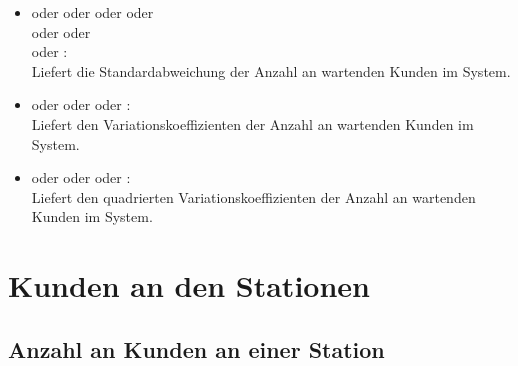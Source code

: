 \begin{itemize}
\item
{} oder  oder  oder  oder\\
 oder  oder\\
 oder :\\
Liefert die Standardabweichung der Anzahl an wartenden Kunden im System.

\item
{} oder  oder  oder :\\
Liefert den Variationskoeffizienten der Anzahl an wartenden Kunden im System.

\item
{} oder  oder  oder :\\
Liefert den quadrierten Variationskoeffizienten der Anzahl an wartenden Kunden im System.

\end{itemize}





\section{Kunden an den Stationen}



\subsection{Anzahl an Kunden an einer Station}

